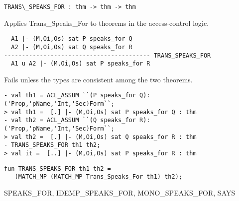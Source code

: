 \begin{verbatim}
TRANS\_SPEAKS_FOR : thm -> thm -> thm
\end{verbatim}

\SYNOPSIS
Applies Trans\_Speaks\_For to theorems in the access-control logic.

\DESCRIBE
\begin{verbatim}
  A1 |- (M,Oi,Os) sat P speaks_for Q
  A2 |- (M,Oi,Os) sat Q speaks_for R
----------------------------------------- TRANS_SPEAKS_FOR
  A1 u A2 |- (M,Oi,Os) sat P speaks_for R
\end{verbatim}

\FAILURE 
Fails unless the types are consistent among the two
theorems.

\EXAMPLE

\begin{holboxed}
  \begin{scriptsize}
\begin{verbatim}
- val th1 = ACL_ASSUM ``(P speaks_for Q):('Prop,'pName,'Int,'Sec)Form``;
> val th1 =  [.] |- (M,Oi,Os) sat P speaks_for Q : thm
- val th2 = ACL_ASSUM ``(Q speaks_for R):('Prop,'pName,'Int,'Sec)Form``;
> val th2 =  [.] |- (M,Oi,Os) sat Q speaks_for R : thm
- TRANS_SPEAKS_FOR th1 th2;
> val it =  [..] |- (M,Oi,Os) sat P speaks_for R : thm
\end{verbatim}
  \end{scriptsize}

\end{holboxed}

\IMPLEMENTATION
\begin{holboxed}
\begin{verbatim}
fun TRANS_SPEAKS_FOR th1 th2 =
   (MATCH_MP (MATCH_MP Trans_Speaks_For th1) th2);
\end{verbatim}
\end{holboxed}

\SEEALSO
SPEAKS\_FOR, IDEMP\_SPEAKS\_FOR, MONO\_SPEAKS\_FOR, SAYS
\ENDDOC



